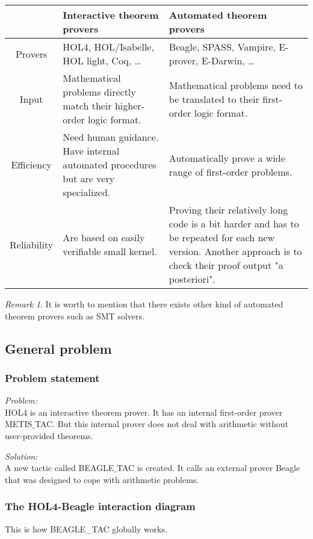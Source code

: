 \documentclass[a4paper, 11pt]{article}
\theoremstyle{plain}
\theoremstyle{definition}
\theoremstyle{remark}
\newtheorem*{remark}{Remark}
\begin{document}
\noindent \begin{tabularx}{\textwidth}{ |c|X|X| }
  \hline
  & Interactive theorem provers & Automated theorem provers\\
  \hline  
  Provers & HOL4, HOL/Isabelle, HOL light, Coq, \ldots 
  & Beagle, SPASS, Vampire, E-prover, E-Darwin, \ldots                                           \\
  \hline  
  Input & Mathematical problems directly match their higher-order logic format.
  & Mathematical problems need to be translated to their first-order logic format.
  \\  
  \hline
  Efficiency & Need human guidance. Have internal automated procedures but are very specialized. & Automatically prove a wide range of first-order problems.\\
  \hline
  Reliability & Are based on easily verifiable small kernel. & Proving their relatively long code is a bit harder and has to be repeated for each new version. Another approach is to check their proof output "a posteriori".\\
  \hline
\end{tabularx}
\begin{remark}
It is worth to mention that there exists other kind of automated theorem provers such as SMT solvers.
\end{remark}
\subsection{General problem}
\subsubsection{Problem statement}
\textit{Problem:}
\\ HOL4 is an interactive theorem prover. It has an internal first-order prover METIS$\_$TAC. But this internal prover does not deal with arithmetic without user-provided theorems.

\noindent \textit{Solution:}
\\A new tactic called BEAGLE$\_$TAC is created. 
It calls an external prover Beagle that was designed to cope with arithmetic problems. 
\\
\subsubsection{The HOL4-Beagle interaction diagram}
  This is how BEAGLE{\_}TAC globally works.
  
\end{document}
